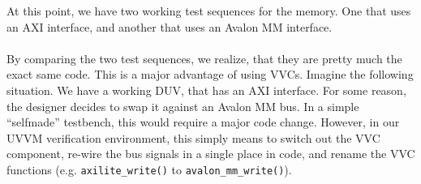 At this point, we have two working test sequences for the memory. One that uses an AXI interface, and another that uses an Avalon MM interface.\\
\\
By comparing the two test sequences, we realize, that they are pretty much the exact same code. This is a major advantage of using VVCs. Imagine the following situation. We have a working DUV, that has an AXI interface. For some reason, the designer decides to swap it against an Avalon MM bus. In a simple ``selfmade'' testbench, this would require a major code change. However, in our UVVM verification environment, this simply means to switch out the VVC component, re-wire the bus signals in a single place in code, and rename the VVC functions (e.g. \texttt{axilite\_write()} to \texttt{avalon\_mm\_write()}).

